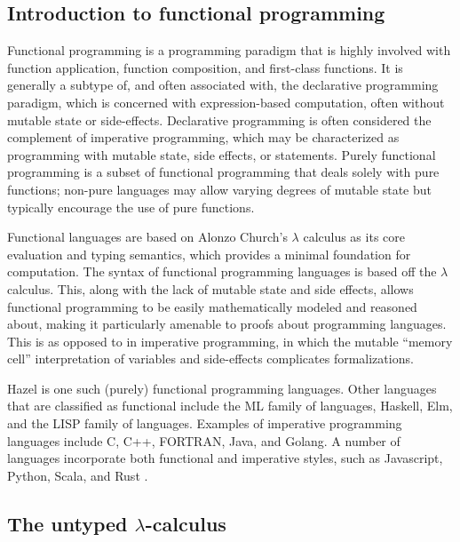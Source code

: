 \subsection{Introduction to functional programming}
\label{sec:fp}

Functional programming  is a programming paradigm that is highly involved with function application, function composition, and first-class functions. It is generally a subtype of, and often associated with, the declarative programming paradigm, which is concerned with expression-based computation, often without mutable state or side-effects. Declarative programming is often considered the complement of imperative programming, which may be characterized as programming with mutable state, side effects, or statements. Purely functional programming is a subset of functional programming that deals solely with pure functions; non-pure languages may allow varying degrees of mutable state but typically encourage the use of pure functions.

Functional languages are based on Alonzo Church's $\lambda$ calculus  as its core evaluation and typing semantics, which provides a minimal foundation for computation. The syntax of functional programming languages is based off the $\lambda$ calculus. This, along with the lack of mutable state and side effects, allows functional programming to be easily mathematically modeled and reasoned about, making it particularly amenable to proofs about programming languages. This is as opposed to in imperative programming, in which the mutable ``memory cell'' interpretation of variables and side-effects complicates formalizations.

Hazel is one such (purely) functional programming languages. Other languages that are classified as functional include the ML family of languages, Haskell, Elm, and the LISP family of languages. Examples of imperative programming languages include C, C++, FORTRAN, Java, and Golang. A number of languages incorporate both functional and imperative styles, such as Javascript, Python, Scala, and Rust .


\subsection{The untyped $\lambda$-calculus}
\label{sec:lambda-calculus}

